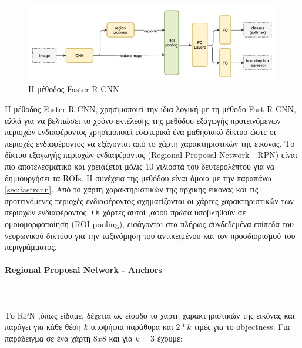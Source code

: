 \begin{figure}[htbp]
  \begin{center}
    \includegraphics[width=0.9\maxwidth]{../figures/fasterrcnn2.png}
    \caption{Η μέθοδος Faster R-CNN\label{fig:fasterrcnn}}
   \end{center}
\end{figure}

H μέθοδος Faster R-CNN, χρησιμοποιεί την ίδια λογική με τη μέθοδο Fast R-CNN,
αλλά για να βελτιώσει το χρόνο εκτέλεσης της μεθόδου εξαγωγής προτεινόμενων
περιοχών ενδιαφέροντος χρησιμοποιεί εσωτερικά ένα μαθησιακό δίκτυο ώστε οι
περιοχές ενδιαφέροντος να εξάγονται από το χάρτη χαρακτηριστικών της εικόνας. Το
δίκτυο εξαγωγής περιοχών ενδιαφέροντος (Regional Proposal Network - RPN) είναι
πιο αποτελεσματικό και χρειάζεται μόλις $10$ χιλιοστά του δευτερολέπτου για να
δημιουργήσει τα ROIs. Η συνέχεια της μεθόδου είναι όμοια με την παραπάνω \ref{sec:fastrcnn}.
Από το χάρτη χαρακτηριστικών της αρχικής εικόνας και τις προτεινόμενες περιοχές
ενδιαφέροντος σχηματίζονται οι χάρτες χαρακτηριστικών των περιοχών ενδιαφέροντος.
Οι χάρτες αυτοί ,αφού πρώτα υποβληθούν σε ομοιομορφοποίηση (ROI pooling), εισάγονται
στα πλήρως συνδεδεμένα επίπεδα του νευρωνικού δικτύου για την ταξινόμηση του
αντικειμένου και τον προσδιορισμού του περιγράμματος.

\paragraph{Regional Proposal Network - Anchors}\hspace{1pt}\\
\\
Το RPN ,όπως είδαμε, δέχεται ως είσοδο το χάρτη χαρακτηριστικών της εικόνας
και παράγει για κάθε θέση $k$ υποψήφια παράθυρα και $2*k$ τιμές για το οbjectness.
Για παράδειγμα σε ένα χάρτη $8x8$ και για $k=3$ έχουμε:

